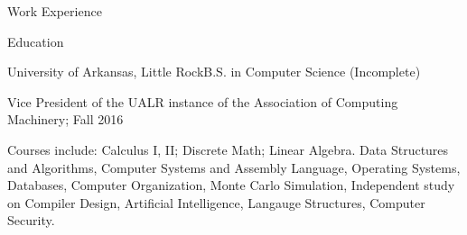 \documentclass{resume} %
\begin{document}
\begin{rSection}{Work Experience}


\end{rSection}


\begin{rSection}{Education}

\begin{rSubsection}{University of Arkansas, Little Rock}{}{B.S. in Computer Science (Incomplete)}

	\item Vice President of the UALR instance of the Association of Computing Machinery; Fall 2016
	\item Courses include: Calculus I, II; Discrete Math; Linear Algebra. Data Structures and Algorithms, Computer Systems and Assembly Language, Operating Systems, Databases, Computer Organization, Monte Carlo Simulation, Independent study on Compiler Design, Artificial Intelligence, Langauge Structures, Computer Security.
\end{rSubsection}


\end{rSection}
\end{document}
